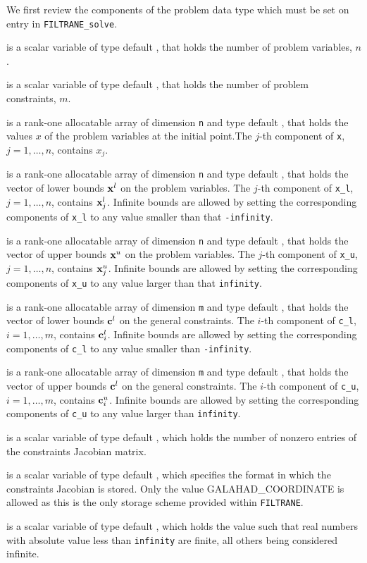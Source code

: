 \documentclass{galahad}
\newcommand{\packagename}{FILTRANE}
\newcommand{\sym}{\sf\small}
\newcommand{\filtrane}{{\tt \packagename}}
\begin{document}
\noindent
We first review the components of the problem data type which must be set on
entry in {\tt \packagename\_solve}.
\begin{description}
 is a scalar variable of type default \integer, 
 that holds the number of problem variables, $n$.  

 is a scalar variable of type default \integer, 
 that holds the number of problem constraints, $m$.

 is a rank-one allocatable array of dimension {\tt n} and type 
default \realdp, that holds the values $x$ of the problem variables at the
initial point.The $j$-th component of {\tt x}, $j = 1,  \ldots , n$, contains
$x_{j}$.

 is a rank-one allocatable array of dimension {\tt n} and type 
default \realdp, that holds
the vector of lower bounds ${\mathbf{x}}^l$ on the problem variables.
The $j$-th component of {\tt x\_l}, $j = 1, \ldots , n$, 
contains ${\mathbf{x}}^l_{j}$.
Infinite bounds are allowed by setting the corresponding 
components of {\tt x\_l} to any value smaller than that {\tt -infinity}.

 is a rank-one allocatable array of dimension {\tt n} and type 
default \realdp, that holds
the vector of upper bounds ${\mathbf{x}}^u$ on the problem variables.
The $j$-th component of {\tt x\_u}, $j = 1, \ldots , n$, 
contains ${\mathbf{x}}^u_{j}$.
Infinite bounds are allowed by setting the corresponding 
components of {\tt x\_u} to any value larger than that {\tt infinity}.

 is a rank-one allocatable array of dimension {\tt m} and type 
default \realdp, that holds the vector of lower bounds ${\mathbf{c}}^{l}$ 
on the general constraints. The $i$-th component of 
{\tt c\_l}, $i = 1, \ldots , m$, contains ${\mathbf{c}}_{i}^{l}$.
Infinite bounds are allowed by setting the corresponding 
components of {\tt c\_l} to any value smaller than {\tt -infinity}. 

 is a rank-one allocatable array of dimension {\tt m} and type 
default \realdp, that holds the vector of upper bounds ${\mathbf{c}}^{l}$ 
on the general constraints. The $i$-th component of 
{\tt c\_u}, $i = 1, \ldots , m$, contains ${\mathbf{c}}_{i}^{u}$.
Infinite bounds are allowed by setting the corresponding 
components of {\tt c\_u} to any value larger than {\tt infinity}. 

 is a scalar variable of type default \integer, 
which holds the number of nonzero entries of the constraints Jacobian matrix.

 is a scalar variable of type default \integer, 
which specifies the format in which the constraints Jacobian is stored.
Only the value {\sym GALAHAD\_COORDINATE} is allowed as this is the only
storage scheme provided within \filtrane.

 is a scalar variable of type default \realdp, which
holds the value such that real numbers with absolute value less than
{\tt infinity} are finite, all others being considered infinite.
\end{description}
\end{document}
